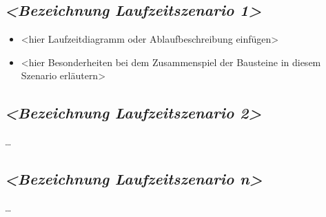 \hypertarget{bezeichnung-laufzeitszenario-1}{%
\subsection{\texorpdfstring{\emph{\textless Bezeichnung Laufzeitszenario
1\textgreater{}}}{\textless Bezeichnung Laufzeitszenario 1\textgreater{}}}\label{bezeichnung-laufzeitszenario-1}}

\begin{itemize}
\tightlist
\item
  \textless hier Laufzeitdiagramm oder Ablaufbeschreibung
  einfügen\textgreater{}
\item
  \textless hier Besonderheiten bei dem Zusammenspiel der Bausteine in
  diesem Szenario erläutern\textgreater{}
\end{itemize}

\hypertarget{bezeichnung-laufzeitszenario-2}{%
\subsection{\texorpdfstring{\emph{\textless Bezeichnung Laufzeitszenario
2\textgreater{}}}{\textless Bezeichnung Laufzeitszenario 2\textgreater{}}}\label{bezeichnung-laufzeitszenario-2}}

\ldots{}

\hypertarget{bezeichnung-laufzeitszenario-n}{%
\subsection{\texorpdfstring{\emph{\textless Bezeichnung Laufzeitszenario
n\textgreater{}}}{\textless Bezeichnung Laufzeitszenario n\textgreater{}}}\label{bezeichnung-laufzeitszenario-n}}

\ldots{}
